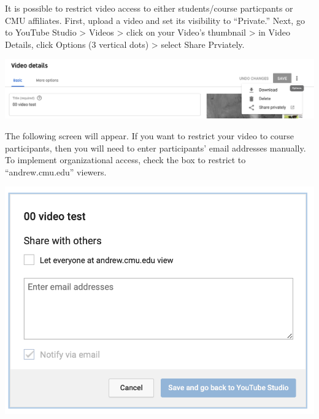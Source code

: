 \begin{gram}
    It is possible to restrict video access to either students/course particpants or CMU affiliates.
    First, upload a video and set its visibility to ``Private.''
    Next, go to YouTube Studio > Videos > click on your Video's thumbnail > in Video Details, click Options (3 vertical dots) > select Share Prviately.

    {
        \centering
        \includegraphics[scale=0.4]{youtube/media/10-youtube-private-access-1.png}
    }

    The following screen will appear.
    If you want to restrict your video to course participants, then you will need to enter participants' email addresses manually.
    To implement organizational access, check the box to restrict to ``andrew.cmu.edu'' viewers.

    {
        \centering
        \includegraphics[scale=0.4]{youtube/media/11-youtube-private-access-2.png}
    }
\end{gram}